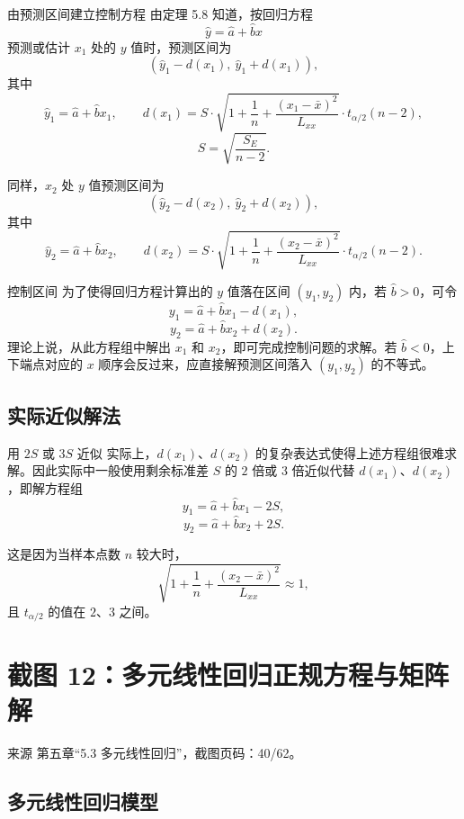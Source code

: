 \documentclass[UTF8,zihao=-4,fontset=fandol]{ctexart}
\begin{document}
\begin{keybox}{由预测区间建立控制方程}
由定理 5.8 知道，按回归方程
\[
\hat{y}=\hat{a}+\hat{b}x
\]
预测或估计 $x_1$ 处的 $y$ 值时，预测区间为
\[
(\hat{y}_1-d(x_1),\ \hat{y}_1+d(x_1)),
\]
其中
\[
\hat{y}_1=\hat{a}+\hat{b}x_1,
\qquad
d(x_1)=
S\cdot
\sqrt{1+\frac{1}{n}+\frac{(x_1-\bar{x})^2}{L_{xx}}}
\cdot t_{\alpha/2}(n-2),
\]
\[
S=\sqrt{\frac{S_E}{n-2}}.
\]

同样，$x_2$ 处 $y$ 值预测区间为
\[
(\hat{y}_2-d(x_2),\ \hat{y}_2+d(x_2)),
\]
其中
\[
\hat{y}_2=\hat{a}+\hat{b}x_2,
\qquad
d(x_2)=
S\cdot
\sqrt{1+\frac{1}{n}+\frac{(x_2-\bar{x})^2}{L_{xx}}}
\cdot t_{\alpha/2}(n-2).
\]
\end{keybox}

\begin{methodbox}{控制区间}
为了使得回归方程计算出的 $y$ 值落在区间 $(y_1,y_2)$ 内，若 $\hat b>0$，可令
\[
y_1=\hat{a}+\hat{b}x_1-d(x_1),
\]
\[
y_2=\hat{a}+\hat{b}x_2+d(x_2).
\]
理论上说，从此方程组中解出 $x_1$ 和 $x_2$，即可完成控制问题的求解。若 $\hat b<0$，上下端点对应的 $x$ 顺序会反过来，应直接解预测区间落入 $(y_1,y_2)$ 的不等式。
\end{methodbox}

\subsection{实际近似解法}

\begin{warnbox}{用 $2S$ 或 $3S$ 近似}
实际上，$d(x_1)$、$d(x_2)$ 的复杂表达式使得上述方程组很难求解。因此实际中一般使用剩余标准差 $S$ 的 $2$ 倍或 $3$ 倍近似代替 $d(x_1)$、$d(x_2)$，即解方程组
\[
y_1=\hat{a}+\hat{b}x_1-2S,
\]
\[
y_2=\hat{a}+\hat{b}x_2+2S.
\]

这是因为当样本点数 $n$ 较大时，
\[
\sqrt{1+\frac{1}{n}+\frac{(x_2-\bar{x})^2}{L_{xx}}}\approx 1,
\]
且 $t_{\alpha/2}$ 的值在 $2$、$3$ 之间。
\end{warnbox}

\section{截图 12：多元线性回归正规方程与矩阵解}

\begin{sourcebox}{来源}
第五章“5.3 多元线性回归”，截图页码：40/62。
\end{sourcebox}

\subsection{多元线性回归模型}
\end{document}

